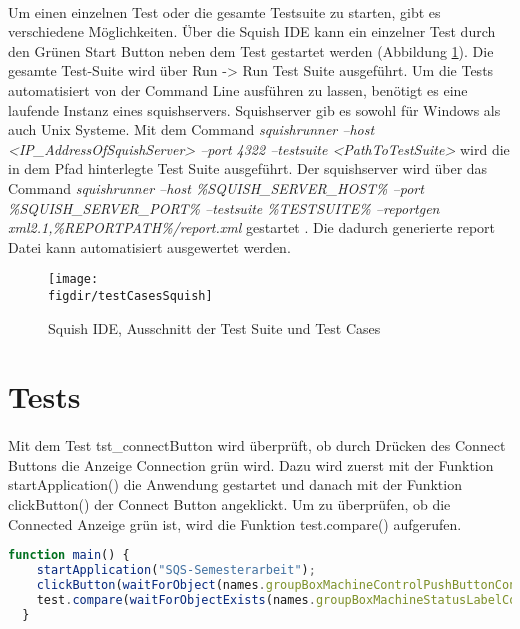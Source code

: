 		\paragraph{} Um einen einzelnen Test oder die gesamte Testsuite zu starten, gibt es verschiedene Möglichkeiten. Über die Squish IDE kann ein einzelner Test durch den Grünen Start Button neben dem Test gestartet werden (Abbildung \ref{FIG:testCasesSquish}). Die gesamte Test-Suite wird über Run -> Run Test Suite ausgeführt. Um die Tests automatisiert von der Command Line ausführen zu lassen, benötigt es eine laufende Instanz eines squishservers. Squishserver gib es sowohl für Windows als auch Unix Systeme. Mit dem Command \textit{squishrunner --host <IP\_AddressOfSquishServer> --port 4322 --testsuite <PathToTestSuite>} wird die in dem Pfad hinterlegte Test Suite ausgeführt. Der squishserver wird über das Command \textit{squishrunner --host \%SQUISH\_SERVER\_HOST\% --port \%SQUISH\_SERVER\_PORT\% --testsuite \%TESTSUITE\% --reportgen xml2.1,\%REPORTPATH\%/report.xml} gestartet \cite{SquishCLI}. Die dadurch generierte report Datei kann automatisiert ausgewertet werden.
		
		\begin{figure}[t]		
			\centering
			\texttt{[image: \\figdir/testCasesSquish]}
		
			\caption[Squish Test Case UI]
			{Squish IDE, Ausschnitt der Test Suite und Test Cases}
			\label{FIG:testCasesSquish}
		\end{figure}
		\FloatBarrier
		
		\section{Tests}
		\paragraph{}Mit dem Test tst\_connectButton wird überprüft, ob durch Drücken des Connect Buttons die Anzeige Connection grün wird. Dazu wird zuerst mit der Funktion startApplication() die Anwendung gestartet und danach mit der Funktion clickButton() der Connect Button angeklickt. Um zu überprüfen, ob die Connected Anzeige grün ist, wird die Funktion test.compare() aufgerufen.
		\begin{lstlisting}[language=JavaScript, caption=tst\_connectButton]
  function main() {
    startApplication("SQS-Semesterarbeit");
    clickButton(waitForObject(names.groupBoxMachineControlPushButtonConnectQPushButton));
    test.compare(waitForObjectExists(names.groupBoxMachineStatusLabelConnectionStatusQLabel).styleSheet, "border-radius: 6px; background-color: rgb(27, 193, 00)");
  }
		\end{lstlisting}
		
